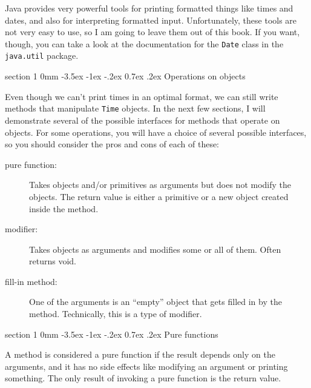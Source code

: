 \documentclass{book}
\makeatletter
\renewcommand{\section}{\@startsection 
    {section} {1} {0mm}%
    {-3.5ex \@plus -1ex \@minus -.2ex}%
    {0.7ex \@plus.2ex}%
    {\normalfont\Large\bfseries}}
\makeatother
\begin{document}
Java provides very powerful tools for printing formatted things
like times and dates, and also for interpreting formatted input.
Unfortunately, these tools are not very easy to use, so I am going to
leave them out of this book.  If you want, though, you can take a look
at the documentation for the {\tt Date} class in the {\tt
java.util} package.


\section{Operations on objects}
\label{objectops}

Even though we can't print times in an optimal format, we can still
write methods that manipulate {\tt Time} objects.  In the next few
sections, I will demonstrate several of the possible interfaces for
methods that operate on objects.  For some operations, you will have a
choice of several possible interfaces, so you should consider the pros
and cons of each of these:

\begin{description}

\item[pure function:]  Takes objects and/or primitives as
arguments but does not modify the objects.  The return value is
either a primitive or a new object created inside the method.

\item[modifier:]  Takes objects as arguments and modifies some
or all of them.  Often returns void. 

\item[fill-in method:]  One of the arguments is an ``empty''
object that gets filled in by the method.  Technically, this is
a type of modifier.

\end{description}

\section{Pure functions}

A method is considered a pure function if the result depends only on
the arguments, and it has no side effects like modifying an argument
or printing something.  The only result of invoking a pure function is
the return value.
\end{document}
